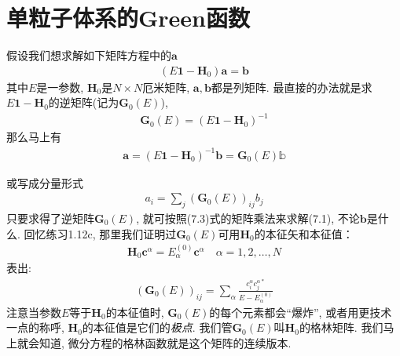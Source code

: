 \section{单粒子体系的Green函数}
假设我们想求解如下矩阵方程中的$\mathbf{a}$
\begin{align}
(E\mathbf{1} - \mathbf{H}_0)\mathbf{a} = \mathbf{b}
\end{align}
其中$E$是一参数, $\mathbf{H}_0$是$N\times N$厄米矩阵, $\mathbf{a,b}$都是列矩阵. 最直接的办法就是求$E\mathbf{1} - \mathbf{H}_0$的逆矩阵(记为$\mathbf{G}_0(E)$),
\begin{align}
\mathbf{G}_0(E) = (E\mathbf{1} - \mathbf{H}_0)^{-1}
\end{align}
那么马上有
\begin{align}
\mathbf{a} = (E\mathbf{1} - \mathbf{H}_0)^{-1}\mathbf{b} = \mathbf{G}_0(E)\mathbb{b}\tag{7.3a}
\end{align}
\addtocounter{equation}{1}
或写成分量形式
\begin{align}
a_i = \sum_j (\mathbf{G}_0(E))_{ij}b_j\tag{7.3b}
\end{align}
只要求得了逆矩阵$\mathbf{G}_0(E)$, 就可按照(7.3)式的矩阵乘法来求解(7.1), 不论$\mathbf{b}$是什么.
回忆练习1.12c, 那里我们证明过$\mathbf{G}_0(E)$可用$\mathbf{H}_0$的本征矢和本征值：
\begin{align}
\mathbf{H}_0\mathbf{c}^\alpha = E_\alpha^{(0)} \mathbf{c}^\alpha \quad \alpha = 1,2,\ldots,N 
\end{align}
表出:
\begin{align}
(\mathbf{G}_0(E))_{ij} = \sum_\alpha \frac{c_i^\alpha c_j^{\alpha*}}{E - E_{\alpha}^{(0)}}
\end{align}
注意当参数$E$等于$\mathbf{H}_0$的本征值时, $\mathbf{G}_0(E)$的每个元素都会“爆炸”, 或者用更技术一点的称呼, $\mathbf{H}_0$的本征值是它们的\emph{极点}. 我们管$\mathbf{G}_0(E)$叫$\mathbf{H}_0$的格林矩阵. 我们马上就会知道, 微分方程的格林函数就是这个矩阵的连续版本.

